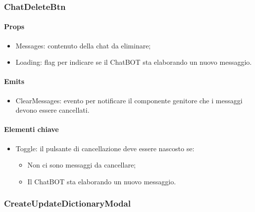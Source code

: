 \subsubsection{ChatDeleteBtn}

\paragraph*{Props}
\begin{itemize}
  \item Messages: contenuto della chat da eliminare;
  \item Loading: flag per indicare se il ChatBOT sta elaborando un nuovo messaggio.
\end{itemize}

\paragraph*{Emits}
\begin{itemize}
  \item ClearMessages: evento per notificare il componente genitore che i messaggi devono essere cancellati.
\end{itemize}

\paragraph*{Elementi chiave}
\begin{itemize}
  \item Toggle: il pulsante di cancellazione deve essere nascosto se:
  \begin{itemize}
    \item Non ci sono messaggi da cancellare;
    \item Il ChatBOT sta elaborando un nuovo messaggio.
  \end{itemize}
\end{itemize}

\subsubsection{CreateUpdateDictionaryModal}

